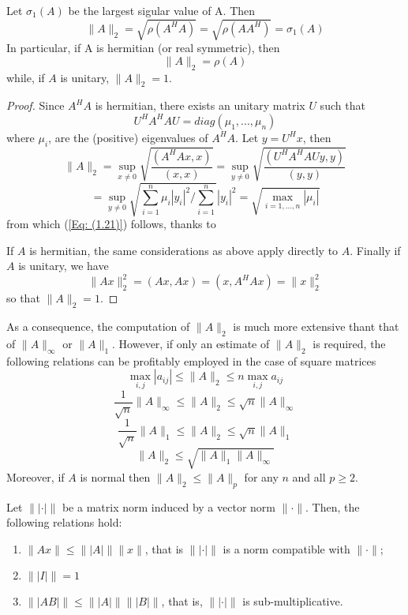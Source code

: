 \begin{theorem}
    Let $\sigma_1(A)$ be the largest sigular value of A. Then
    \begin{equation}
        \|A\|_2 = \sqrt{\rho (A^H A)} = \sqrt{\rho (A A^H)} = \sigma_1 (A)
        \label{Eq: (1.21)}
    \end{equation}
    In particular, if A is hermitian (or real symmetric), then
    \begin{equation}
        \|A\|_2 = \rho(A)
        \label{Eq: (1.22)}
    \end{equation}
    while, if $A$ is unitary, $\|A\|_2 = 1$.
\end{theorem}

\begin{proof}
    Since $A^H A$ is hermitian, there exists an unitary matrix $U$ such that
    \[ U^H A^H A U = diag(\mu_1,...,\mu_n) \]
    where $\mu_i$, are the (positive) eigenvalues of $A^H A$. Let $y = U^H x$, then
    \[ \|A\|_2 = \sup_{x \neq 0}\sqrt{\frac{(A^H A x, x)}{(x, x)}} = \sup_{y \neq 0}\sqrt{\frac{(U^H A^H A Uy, y)}{(y,y)}} \]
    \[ = \sup_{y \neq 0}\sqrt{\sum_{i = 1}^{n} \mu_i |y_i|^2 / \sum_{i = 1}^{n}}|y_i|^2 = \sqrt{\max_{i = 1,...,n} |\mu_i| } \]
    from which (\ref{Eq: (1.21)}) follows, thanks to %

    If $A$ is hermitian, the same considerations as above apply directly to $A$. Finally if $A$ is unitary, we have
    \[ \|Ax\|_2^2 = (Ax, Ax) = (x, A^H Ax) = \|x\|_2^2 \]
    so that $\|A\|_2 = 1$.
\end{proof}

As a consequence, the computation of $\|A\|_2$ is much more extensive thant that of $\|A\|_\infty$ or $\|A\|_1$. However, if only an estimate of $\|A\|_2$ is required, the following relations can be profitably employed in the case of square matrices
\[ \max_{i,j}{|a_{ij}|} \leq \|A\|_2 \leq n \max_{i,j}{a_{ij}} \]
\[ \frac{1}{\sqrt{n}} \|A\|_\infty \leq \|A\|_2 \leq \sqrt{n} \|A\|_\infty \]
\[ \frac{1}{\sqrt{n}} \|A\|_1 \leq \|A\|_2 \leq \sqrt{n} \|A\|_1 \]
\[ \|A\|_2 \leq \sqrt{\|A\|_1 \|A\|_\infty} \]
Moreover, if $A$ is normal then $\|A\|_2 \leq \|A\|_p$ for any $n$ and all $ p \geq 2 $.

\begin{theorem}
    Let $ \||\cdot|\| $ be a matrix norm induced by a vector norm $\| \cdot \|$. Then, the following relations hold:
    \begin{enumerate}
        \item $ \|Ax\| \leq \||A|\|  \|x\| $, that is $ \||\cdot|\| $ is a norm compatible with $\|\cdot\|$;
        \item $\||I|\| = 1 $
        \item $\||AB|\| \leq \||A|\| \||B|\|$, that is, $ \||\cdot|\| $ is sub-multiplicative.
    \end{enumerate}
\end{theorem}

